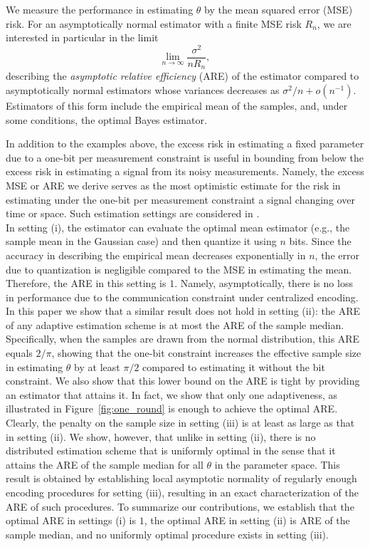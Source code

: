 \documentclass[letterpaper, 11pt]{IEEEtran}      %
\begin{document}
%
We measure the performance in estimating $\theta$ by the mean squared error (MSE) risk. For an asymptotically normal estimator with a finite MSE risk $R_n$, we are interested in particular in the limit
\[
\lim_{n\to \infty} \frac{\sigma^2}{n R_n},
\]
describing the 
 \emph{asymptotic relative efficiency} (ARE) of the estimator compared to asymptotically normal estimators whose variances decreases as $\sigma^2/n+o(n^{-1})$. Estimators of this form include the empirical mean of the samples, and, under some conditions, the optimal Bayes estimator. \par
%
In addition to the examples above, the excess risk in estimating a fixed parameter due to a one-bit per measurement constraint is useful in bounding from below the excess risk in estimating a signal from its noisy measurements. Namely, the excess MSE or ARE we derive serves as the most optimistic estimate for the risk in estimating under the one-bit per measurement constraint a signal changing over time or space. Such estimation settings are considered in \cite{baraniuk2017exponential, jacques2013robust, plan2013one, li2017channel, choi2016near}. \\


In setting (i), the estimator can evaluate the optimal mean estimator (e.g., the sample mean in the Gaussian case) and then quantize it using $n$ bits. Since the accuracy in describing the empirical mean decreases exponentially in $n$, the error due to quantization is negligible compared to the MSE in estimating the mean. Therefore, the ARE in this setting is $1$. Namely, asymptotically, there is no loss in performance due to the communication constraint under centralized encoding. 
%
In this paper we show that a similar result does not hold in setting (ii): the ARE of any adaptive estimation scheme is at most the ARE of the sample median. Specifically, when the samples are drawn from the normal distribution, this ARE equals $2/\pi$, showing that the one-bit constraint increases the effective sample size in estimating $\theta$ by at least $\pi/2$ compared to estimating it without the bit constraint. We also show that this lower bound on the ARE is tight by providing an estimator that attains it. In fact, we show that only one adaptiveness, as illustrated in Figure~\ref{fig:one_round} is enough to achieve the optimal ARE. 
%
Clearly, the penalty on the sample size in setting (iii) is at least as large as that in setting (ii). We show, however, that unlike in setting (ii), there is no distributed estimation scheme that is uniformly optimal in the sense that it attains the ARE of the sample median for all $\theta$ in the parameter space. This result is obtained by establishing local asymptotic normality of regularly enough encoding procedures for setting (iii), resulting in an exact characterization of the ARE of such procedures. To summarize our contributions, we establish that the optimal ARE in settings (i) is $1$, the optimal ARE in setting (ii) is ARE of the sample median, and no uniformly optimal procedure exists in setting (iii). 
\end{document}
